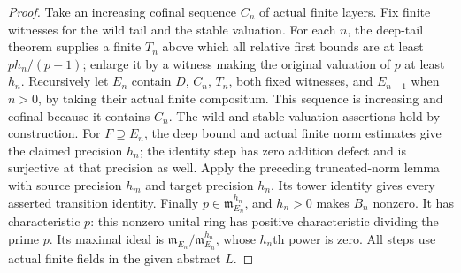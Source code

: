 \begin{proof}
Take an increasing cofinal sequence $C_n$ of actual finite layers.
Fix finite witnesses for the wild tail and the stable valuation.
For each $n$, the deep-tail theorem supplies a finite $T_n$ above which
all relative first bounds are at least $ph_n/(p-1)$; enlarge it by a
witness making the original valuation of $p$ at least $h_n$.
Recursively let $E_n$ contain $D$, $C_n$, $T_n$, both fixed witnesses,
and $E_{n-1}$ when $n>0$, by taking their actual finite compositum.
This sequence is increasing and cofinal because it contains $C_n$.
The wild and stable-valuation assertions hold by construction.
For $F\supseteq E_n$, the deep bound and actual finite norm estimates
give the claimed precision $h_n$; the identity step has zero addition
defect and is surjective at that precision as well.
Apply the preceding truncated-norm lemma with source precision $h_m$
and target precision $h_n$. Its tower identity gives every asserted
transition identity. Finally $p\in\mathfrak m_{E_n}^{h_n}$, and $h_n>0$ makes
$B_n$ nonzero. It has characteristic $p$: this nonzero unital ring has
positive characteristic dividing the prime $p$. Its maximal ideal
is $\mathfrak m_{E_n}/\mathfrak m_{E_n}^{h_n}$, whose $h_n$th power
is zero. All steps use actual finite fields in the given abstract $L$.
\end{proof}


